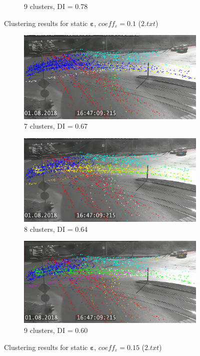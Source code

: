 \begin{figure}[!htb]
\begin{subfigure}[!htb]{0.495\textwidth}
		\caption{9 clusters, DI = 0.78}
		\label{fig:2-9cl-01}
	\end{subfigure}
	\caption{Clustering results for static $\bm{\varepsilon}$, $coeff_\varepsilon = 0.1$ ($2.txt$)}
	\label{fig:clust-res-2-01}
\end{figure}

\begin{figure}[!htb]
	\centering
	\begin{subfigure}[!htb]{0.495\textwidth}
		\centering{}
		\includegraphics[width=\textwidth]{images/cl-res/2-7cl-015.png}
		\caption{7 clusters, DI = 0.67}
		\label{fig:2-7cl-015}
	\end{subfigure}
	\hfill
	\begin{subfigure}[!htb]{0.495\textwidth}
		\centering{}
		\includegraphics[width=\textwidth]{images/cl-res/2-8cl-015.png}
		\caption{8 clusters, DI = 0.64}
		\label{fig:2-8cl-015}
	\end{subfigure}
	\hfill
	\begin{subfigure}[!htb]{0.495\textwidth}
		\centering{}
		\includegraphics[width=\textwidth]{images/cl-res/2-9cl-015.png}
		\caption{9 clusters, DI = 0.60}
		\label{fig:2-9cl-015}
	\end{subfigure}
	\caption{Clustering results for static $\bm{\varepsilon}$, $coeff_\varepsilon = 0.15$ ($2.txt$)}
	\label{fig:clust-res-2-015}
\end{figure}